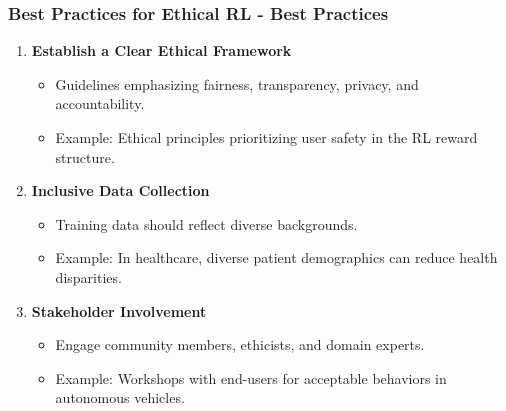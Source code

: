 \documentclass[aspectratio=169]{beamer}
\begin{document}
\begin{frame}[fragile]
    \frametitle{Best Practices for Ethical RL - Best Practices}
    \begin{enumerate}
        \item \textbf{Establish a Clear Ethical Framework}
            \begin{itemize}
                \item Guidelines emphasizing fairness, transparency, privacy, and accountability.
                \item Example: Ethical principles prioritizing user safety in the RL reward structure.
            \end{itemize}
        
        \item \textbf{Inclusive Data Collection}
            \begin{itemize}
                \item Training data should reflect diverse backgrounds.
                \item Example: In healthcare, diverse patient demographics can reduce health disparities.
            \end{itemize}
        
        \item \textbf{Stakeholder Involvement}
            \begin{itemize}
                \item Engage community members, ethicists, and domain experts.
                \item Example: Workshops with end-users for acceptable behaviors in autonomous vehicles.
            \end{itemize}
    \end{enumerate}
\end{frame}
\end{document}
